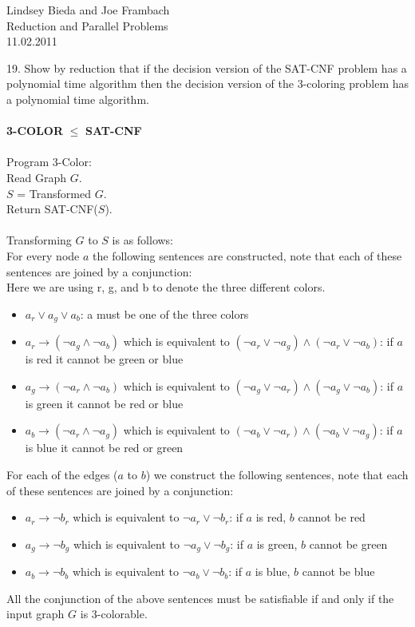\documentclass[10pt]{article}
\newcommand{\tab}{\hspace*{2em}}
\begin{document}
	\begin{flushright}
	Lindsey Bieda and Joe Frambach\\
	Reduction and Parallel Problems\\
	11.02.2011
	\end{flushright}
19. Show by reduction that if the decision version of the SAT-CNF problem has a polynomial time algorithm
then the decision version of the 3-coloring problem has a polynomial time algorithm.\\
\\
\textbf{3-COLOR} $\leq$ \textbf{SAT-CNF}\\
\\
Program 3-Color:\\
\tab Read Graph $G$.\\
\tab $S$ = Transformed $G$.\\
\tab Return SAT-CNF($S$).\\
\\
Transforming $G$ to $S$ is as follows:\\ 
For every node $a$ the following sentences are constructed, note that each of these sentences
are joined by a conjunction:\\
Here we are using r, g, and b to denote the three different colors. 
\begin{itemize}
	\item $a_r \vee a_g \vee a_b$: a must be one of the three colors
	\item $a_r \rightarrow (\neg a_g \wedge \neg a_b)$ which is equivalent to $(\neg a_r \vee \neg a_g) \wedge (\neg a_r \vee \neg a_b)$: if $a$ is red it cannot be green or blue
	\item $a_g \rightarrow (\neg a_r \wedge \neg a_b)$ which is equivalent to $(\neg a_g \vee \neg a_r) \wedge (\neg a_g \vee \neg a_b)$: if $a$ is green it cannot be red or blue
	\item $a_b \rightarrow (\neg a_r \wedge \neg a_g)$ which is equivalent to $(\neg a_b \vee \neg a_r) \wedge (\neg a_b \vee \neg a_g)$: if $a$ is blue it cannot be red or green
\end{itemize}
For each of the edges ($a$ to $b$) we construct the following sentences, note that each of these
sentences are joined by a conjunction:
\begin{itemize}
	\item $a_r \rightarrow \neg b_r$ which is equivalent to $\neg a_r \vee \neg b_r$: if $a$ is red, $b$ cannot be red
	\item $a_g \rightarrow \neg b_g$ which is equivalent to $\neg a_g \vee \neg b_g$: if $a$ is green, $b$ cannot be green
	\item $a_b \rightarrow \neg b_b$ which is equivalent to $\neg a_b \vee \neg b_b$: if $a$ is blue, $b$ cannot be blue  
\end{itemize}
All the conjunction of the above sentences must be satisfiable if and only if the input graph $G$ is 3-colorable.
\end{document}
